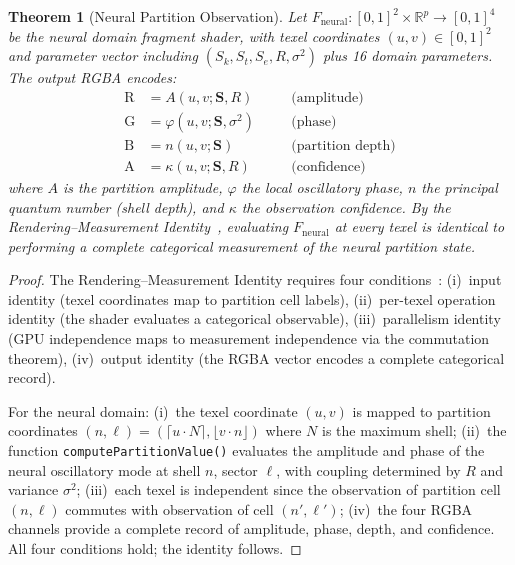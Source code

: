 \documentclass[11pt,twocolumn,a4paper]{article}
\newtheorem{theorem}{Theorem}[section]
\newcommand{\Sk}{S_k}
\newcommand{\St}{S_t}
\newcommand{\Se}{S_e}
\newcommand{\R}{\mathbb{R}}
\newcommand{\Svec}{\mathbf{S}}
\begin{document}
\begin{theorem}[Neural Partition Observation]
\label{thm:neural-observation}
Let $F_{\mathrm{neural}} : [0,1]^2 \times \R^p \to [0,1]^4$ be the neural domain fragment shader, with texel coordinates $(u,v) \in [0,1]^2$ and parameter vector including $(\Sk, \St, \Se, R, \sigma^2)$ plus 16 domain parameters.
The output RGBA encodes:
\begin{align}
\mathrm{R} &= A(u,v;\Svec,R) \quad &&\text{(amplitude)} \label{eq:rgba-r} \\
\mathrm{G} &= \varphi(u,v;\Svec,\sigma^2) \quad &&\text{(phase)} \label{eq:rgba-g} \\
\mathrm{B} &= n(u,v;\Svec) \quad &&\text{(partition depth)} \label{eq:rgba-b} \\
\mathrm{A} &= \kappa(u,v;\Svec,R) \quad &&\text{(confidence)} \label{eq:rgba-a}
\end{align}
where $A$ is the partition amplitude, $\varphi$ the local oscillatory phase, $n$ the principal quantum number (shell depth), and $\kappa$ the observation confidence.
By the Rendering--Measurement Identity~\cite{sachikonye2026gpu}, evaluating $F_{\mathrm{neural}}$ at every texel is identical to performing a complete categorical measurement of the neural partition state.
\end{theorem}

\begin{proof}
The Rendering--Measurement Identity requires four conditions~\cite{sachikonye2026gpu}: (i)~input identity (texel coordinates map to partition cell labels), (ii)~per-texel operation identity (the shader evaluates a categorical observable), (iii)~parallelism identity (GPU independence maps to measurement independence via the commutation theorem), (iv)~output identity (the RGBA vector encodes a complete categorical record).

For the neural domain: (i)~the texel coordinate $(u,v)$ is mapped to partition coordinates $(n,\ell) = (\lceil u \cdot N \rceil, \lfloor v \cdot n \rfloor)$ where $N$ is the maximum shell; (ii)~the function \texttt{computePartitionValue()} evaluates the amplitude and phase of the neural oscillatory mode at shell $n$, sector $\ell$, with coupling determined by $R$ and variance $\sigma^2$; (iii)~each texel is independent since the observation of partition cell $(n,\ell)$ commutes with observation of cell $(n',\ell')$; (iv)~the four RGBA channels provide a complete record of amplitude, phase, depth, and confidence.
All four conditions hold; the identity follows.
\end{proof}
\end{document}
